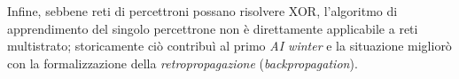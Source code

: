 Infine, sebbene reti di percettroni possano risolvere XOR, l’algoritmo di apprendimento del singolo percettrone non è direttamente applicabile a reti multistrato; storicamente ciò contribuì al primo \emph{AI winter} e la situazione migliorò con la formalizzazione della \emph{retropropagazione} (\emph{backpropagation}).

